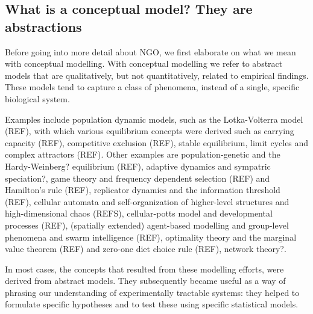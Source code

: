 \subsection{What is a conceptual model? They are abstractions}

Before going into more detail about NGO, we first elaborate on what we mean with conceptual modelling. With conceptual modelling we refer to abstract models that are qualitatively, but not quantitatively, related to empirical findings. These models tend to capture a class of phenomena, instead of a single, specific biological system.

Examples include population dynamic models, such as the Lotka-Volterra model (REF), with which various equilibrium concepts were derived such as carrying capacity (REF), competitive exclusion (REF), stable equilibrium, limit cycles and complex attractors (REF). Other examples are population-genetic and the Hardy-Weinberg? equilibrium (REF), adaptive dynamics and sympatric speciation?, game theory and frequency dependent selection (REF) and Hamilton’s rule (REF), replicator dynamics and the information threshold (REF), cellular automata and self-organization of higher-level structures and high-dimensional chaos (REFS), cellular-potts model and developmental processes (REF), (spatially extended) agent-based modelling and group-level phenomena and swarm intelligence (REF), optimality theory and the marginal value theorem (REF) and zero-one diet choice rule (REF), network theory?.

In most cases, the concepts that resulted from these modelling efforts, were derived from abstract models. They subsequently became useful as a way of phrasing our understanding of experimentally tractable systems: they helped to formulate specific hypotheses and to test these using specific statistical models.
  